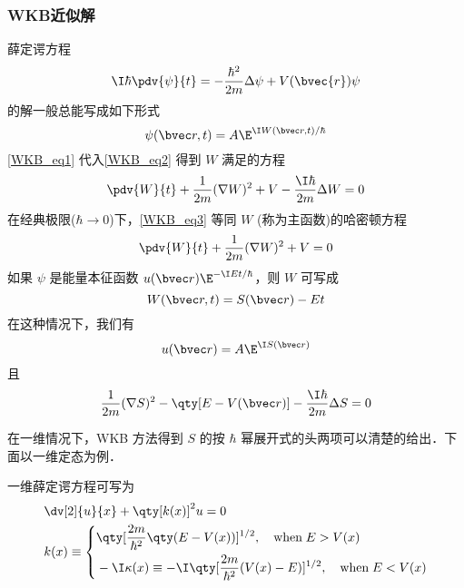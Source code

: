 \subsubsection{WKB近似解}
薛定谔方程
\begin{equation}\label{WKB_eq2}
\I\hbar\pdv{\psi}{t}=-\frac{\hbar^2}{2m}\Delta\psi+V(\bvec{r})\psi
\end{equation}
的解一般总能写成如下形式
\begin{equation}\label{WKB_eq1}
\psi(\bvec r,t)=A\E^{\I W(\bvec r,t)/\hbar}
\end{equation}
\autoref{WKB_eq1} 代入\autoref{WKB_eq2} 得到 $W$ 满足的方程
\begin{equation}\label{WKB_eq3}
\pdv{W}{t}+\frac{1}{2m}(\nabla W)^2+V-\frac{\I\hbar}{2m}\Delta W=0
\end{equation}
在经典极限($\hbar\rightarrow 0$)下，\autoref{WKB_eq3} 等同 $W$ (称为主函数)的哈密顿方程
\begin{equation}
\pdv{W}{t}+\frac{1}{2m}(\nabla W)^2+V=0
\end{equation}
如果 $\psi$ 是能量本征函数 $u(\bvec r)\E^{-\I Et/\hbar}$，则 $W$ 可写成
\begin{equation}
W(\bvec r,t)=S(\bvec r)-Et
\end{equation}
在这种情况下，我们有
\begin{equation}
u(\bvec r)=A\E^{\I S(\bvec r)}
\end{equation}
且
\begin{equation}
\frac{1}{2m}(\nabla S)^2-\qty[E-V(\bvec r)]-\frac{\I\hbar}{2m}\Delta S=0
\end{equation}

在一维情况下，WKB 方法得到 $S$ 的按 $\hbar$ 幂展开式的头两项可以清楚的给出．下面以一维定态为例．

一维薛定谔方程可写为\cite{Sakurai}
\begin{equation}\label{WKB_eq4}
\begin{aligned}
&\dv[2]{u}{x}+\qty[k(x)]^2u=0\\
&k(x)\equiv\left\{\begin{aligned}
&\qty[\frac{2m}{\hbar^2}\qty(E-V(x))]^{1/2},\quad \text{when}\; E>V(x)\\
&-\I\kappa(x)\equiv-\I\qty[\frac{2m}{\hbar^2}(V(x)-E)]^{1/2},\quad \text{when}\; E<V(x)
\end{aligned}\right.
\end{aligned}
\end{equation}

